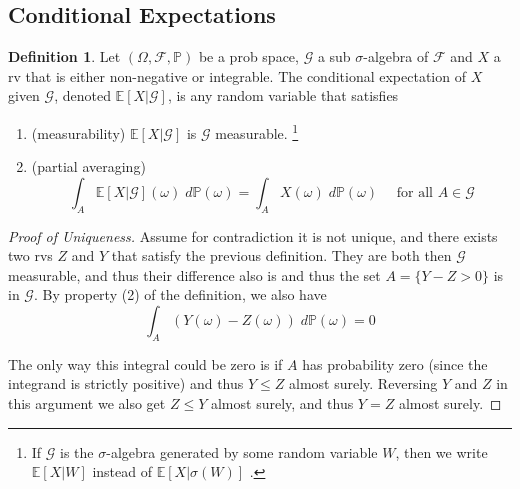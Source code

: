 \documentclass[11pt]{article}
\theoremstyle{definition}
\theoremstyle{definition}
\theoremstyle{definition}
\newtheorem{definition}{\textcolor{OliveGreen}{Definition}}
\theoremstyle{remark}
\begin{document}
\subsection{Conditional Expectations}

\begin{definition}
    Let $(\Omega, \mathcal{F}, \mathbb{P})$ be a prob space, $\mathcal{G}$ a sub $\sigma$-algebra of $\mathcal{F}$ and
    $X$ a rv that is either non-negative or integrable. The conditional expectation of $X$ given $\mathcal{G}$, denoted
    $\mathbb{E}[X | \mathcal{G}]$, is any random variable that satisfies
    \begin{enumerate}
        \item (measurability) $\mathbb{E}[X | \mathcal{G}]$ is $\mathcal{G}$ measurable. \footnote{If $\mathcal{G}$ is the $\sigma$-algebra
        generated by some random variable $W$, then we write $\mathbb{E}[X | W]$ instead of $\mathbb{E}[X | \sigma(W)]$ .}
        \item (partial averaging)
        \[
            \int_A \mathbb{E}[X | \mathcal{G}](\omega) \; d \mathbb{P}(\omega) = \int_A X(\omega) \; d \mathbb{P}(\omega) \quad \text{ for all } A \in \mathcal{G}
        \] 
    \end{enumerate}
\end{definition}

\begin{proof}[Proof of Uniqueness]
    Assume for contradiction it is not unique, and there exists two rvs $Z$ and $Y$ that satisfy
    the previous definition. They are both then $\mathcal{G}$ measurable, and thus their difference also is and thus the set
    $A = \{ Y - Z > 0\}$ is in $\mathcal{G}$. By property (2) of the definition, we also have
    \[
        \int_A (Y(\omega) - Z(\omega)) \; d \mathbb{P}(\omega) = 0
    \]  

    The only way this integral could be zero is if $A$ has probability zero (since the integrand is strictly positive)
    and thus $Y \leq Z$ almost surely. Reversing $Y$ and $Z$ in this argument we also get $Z \leq Y$ almost surely,
    and thus $Y = Z$ almost surely.   
\end{proof}   
\end{document}
